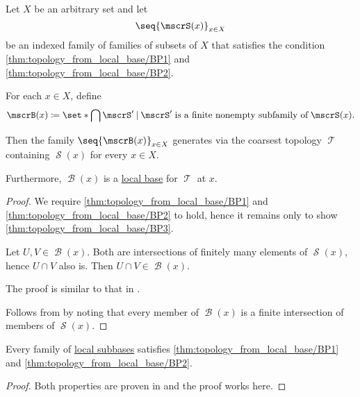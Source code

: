 \begin{proposition}\label{thm:topology_from_local_subbase}
  Let \( X \) be an arbitrary set and let
  \begin{equation*}
    \seq{ \mscrS(x) }_{x \in X}
  \end{equation*}
  be an indexed family of families of subsets of \( X \) that satisfies the condition \ref{thm:topology_from_local_base/BP1} and \ref{thm:topology_from_local_base/BP2}.

  For each \( x \in X \), define
  \begin{equation*}
    \mscrB(x) \coloneqq \set*{ \bigcap \mscrS' \given \mscrS' \T{is a finite nonempty subfamily of} \mscrS(x) }.
  \end{equation*}

  Then the family \( \seq{ \mscrB(x) }_{x \in X} \) generates via  the coarsest topology \( \mscrT \) containing \( \mscrS(x) \) for every \( x \in X \).

  Furthermore, \( \mscrB(x) \) is a \hyperref[def:topological_local_base]{local base} for \( \mscrT \) at \( x \).
\end{proposition}
\begin{proof}
   We require \ref{thm:topology_from_local_base/BP1} and \ref{thm:topology_from_local_base/BP2} to hold, hence it remains only to show \ref{thm:topology_from_local_base/BP3}.

  Let \( U, V \in \mscrB(x) \). Both are intersections of finitely many elements of \( \mscrS(x) \), hence \( U \cap V \) also is. Then \( U \cap V \in \mscrB(x) \).

   The proof is similar to that in .

   Follows from  by noting that every member of \( \mscrB(x) \) is a finite intersection of members of \( \mscrS(x) \).
\end{proof}

\begin{proposition}\label{thm:local_subbase_can_generate_topology}
  Every family of \hyperref[def:topological_local_subbase]{local subbases} satisfies \ref{thm:topology_from_local_base/BP1} and \ref{thm:topology_from_local_base/BP2}.
\end{proposition}
\begin{proof}
  Both properties are proven in  and the proof works here.
\end{proof}

